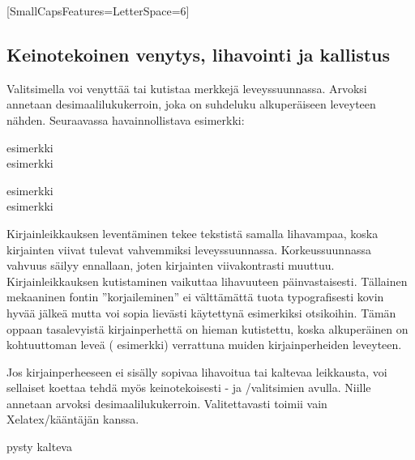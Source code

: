 \begin{koodilohkosis}
  \setmainfont{…}[SmallCapsFeatures={LetterSpace=6}]
\end{koodilohkosis}

\subsection{Keinotekoinen venytys, lihavointi ja kallistus}
\label{luku:fontit_venytys}

Valitsimella   voi
venyttää tai kutistaa merkkejä leveyssuunnassa. Arvoksi annetaan
desimaalilukukerroin, joka on suhdeluku alkuperäiseen leveyteen nähden.
Seuraavassa havainnollistava esimerkki:

\begin{koodilohkosis}
  esimerkki \\
  { esimerkki}
\end{koodilohkosis}

\begin{tulossis}
  esimerkki \\
  { esimerkki}
\end{tulossis}

Kirjainleikkauksen leventäminen tekee tekstistä samalla lihavampaa,
koska kirjainten viivat tulevat vahvemmiksi leveyssuunnassa.
Korkeussuunnassa vahvuus säilyy ennallaan, joten kirjainten
viivakontrasti muuttuu. Kirjainleikkauksen kutistaminen vaikuttaa
lihavuuteen päinvastaisesti. Tällainen mekaaninen fontin
''korjaileminen'' ei välttämättä tuota typografisesti kovin hyvää jälkeä
mutta voi sopia lievästi käytettynä esimerkiksi otsikoihin. Tämän oppaan
tasalevyistä kirjainperhettä on hieman kutistettu, koska alkuperäinen on
kohtuuttoman leveä ({\ttfamily{}
  esimerkki}) verrattuna muiden kirjainperheiden leveyteen.

Jos   kirjainperheeseen
ei sisälly sopivaa lihavoitua tai kaltevaa leikkausta, voi sellaiset
koettaa tehdä myös keinotekoisesti - ja
\-/valitsimien avulla. Niille annetaan arvoksi
desimaalilukukerroin. Valitettavasti  toimii vain
Xelatex\-/kääntäjän kanssa.

\begin{koodilohkosis}
  pysty { kalteva}
\end{koodilohkosis}

